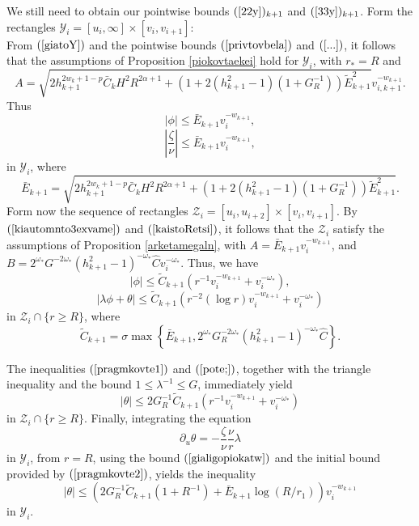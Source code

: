\documentclass{article}
\newcommand{\zn}{\frac{\zeta}{\nu}}
\begin{document}
We still need to
obtain our pointwise bounds $(\ref{22y})_{k+1}$ and $(\ref{33y})_{k+1}$.
Form the rectangles $\mathcal{Y}_i=[u_i,\infty]\times [v_i,v_{i+1}]$:
\[

\]
From $(\ref{giatoY})$ and
the pointwise bounds $(\ref{privtovbela})$ and $(\ref{...})$, it follows that the
assumptions of Proposition \ref{piokovtaekei} hold for $\mathcal{Y}_i$,
with $r_*=R$ and
\[
A=\sqrt{2h_{k+1}^{2w_k+1-p}\bar{C}_kH^2
R^{2\alpha+1}+(1+2(h_{k+1}^2-1)(1+G_R^{-1}))
\tilde{E}_{k+1}^2}v_{i,k+1}^{-w_{k+1}}.
\]
Thus
\begin{equation}
\label{kaistoRetsi}
|\phi|\le \bar{E}_{k+1}v_i^{-w_{k+1}},
\end{equation}
\begin{equation}
\label{gialigopiokatw}
\left|\zn\right|\le \bar{E}_{k+1}v_i^{-w_{k+1}},
\end{equation}
in $\mathcal{Y}_i$,
where 
\[
\bar{E}_{k+1}=\sqrt{2h_{k+1}^{2w_k+1-p}\bar{C}_kH^2
R^{2\alpha+1}+(1+2(h_{k+1}^2-1)(1+G_R^{-1}))
\tilde{E}_{k+1}^2}.
\]
Form now the
sequence of rectangles $\mathcal{Z}_i=[u_i,u_{i+2}]\times[v_i,v_{i+1}]$. 
By $(\ref{kiautomnto3exvame})$ and $(\ref{kaistoRetsi})$,
it follows that the $\mathcal{Z}_i$ satisfy the assumptions of 
Proposition \ref{arketamegaln},
with $A=\bar{E}_{k+1}v_i^{-w_{k+1}}$, and 
$B=2^{\omega_*}G^{-2\omega_*}(h_{k+1}^2-1)^{-\omega_*}\hat{C}v_i^{-\omega_*}$.
Thus, we have
\begin{equation}
\label{pragmkovte1}
|\phi|\le{\tilde{C}}_{k+1}\left(r^{-1} v_i^{-w_{k+1}}+v_i^{-\omega_*}\right),
\end{equation}
\begin{equation}
\label{pote;}
|\lambda\phi+\theta|\le{\tilde{C}}_{k+1}\left(r^{-2}(\log r) v_i^{-w_{k+1}}
+v_i^{-\omega_*}\right)
\end{equation}
in $\mathcal{Z}_i\cap\{r\ge R\}$,
where
\[
{\tilde{C}}_{k+1}=\sigma\max\left\{\bar{E}_{k+1},
2^{\omega_*}G_R^{-2\omega_*}(h_{k+1}^2-1)^{-\omega_*}\hat{C}\right\}.
\]


The inequalities $(\ref{pragmkovte1})$ and $(\ref{pote;})$,
together with the triangle inequality
and the bound
$1\le\lambda^{-1}\le G$,
 immediately yield
\begin{equation}
\label{pragmkovte2}
|\theta|\le 2G_R^{-1}{\tilde{C}}_{k+1}
\left(r^{-1}v_i^{-w_{k+1}}+v_i^{-\omega_*}\right)
\end{equation}
in $\mathcal{Z}_i\cap\{r\ge R\}$.
Finally, integrating the equation
\[
\partial_u\theta=-\zn\frac\nu{r}\lambda
\]
in $\mathcal{Y}_i$, from $r=R$, using the bound $(\ref{gialigopiokatw})$
and the initial bound provided by $(\ref{pragmkovte2})$,
yields the inequality
\begin{equation}
\label{thkaistoY}
|\theta|\le (2G_R^{-1}{\tilde{C}}_{k+1}(1+R^{-1})+
\bar{E}_{k+1}\log (R/r_1))v_i^{-w_{k+1}}
\end{equation}
in $\mathcal{Y}_i$.
\end{document}
